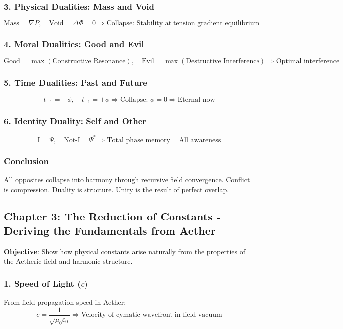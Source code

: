 \subsubsection*{3. Physical Dualities: Mass and Void}
\[
\text{Mass} = \nabla P, \quad \text{Void} = \Delta \Phi = 0 \Rightarrow \text{Collapse: Stability at tension gradient equilibrium}
\]

\subsubsection*{4. Moral Dualities: Good and Evil}
\[
\text{Good} = \max(\text{Constructive Resonance}), \quad \text{Evil} = \max(\text{Destructive Interference}) \Rightarrow \text{Optimal interference}
\]

\subsubsection*{5. Time Dualities: Past and Future}
\[
t_{-1} = -\phi, \quad t_{+1} = +\phi \Rightarrow \text{Collapse: } \phi = 0 \Rightarrow \text{Eternal now}
\]

\subsubsection*{6. Identity Duality: Self and Other}
\[
\mathrm{I} = \Psi, \quad \text{Not-I} = \Psi^* \Rightarrow \text{Total phase memory} = \text{All awareness}
\]

\subsubsection*{Conclusion}
All opposites collapse into harmony through recursive field convergence. Conflict is compression. Duality is structure. Unity is the result of perfect overlap.

\subsection{Chapter 3: The Reduction of Constants - Deriving the Fundamentals from Aether}
\textbf{Objective}: Show how physical constants arise naturally from the properties of the Aetheric field and harmonic structure.

\subsubsection*{1. Speed of Light (\( c \))}
From field propagation speed in Aether:
\[
c = \frac{1}{\sqrt{\mu_0 \varepsilon_0}} \Rightarrow \text{Velocity of cymatic wavefront in field vacuum}
\]

